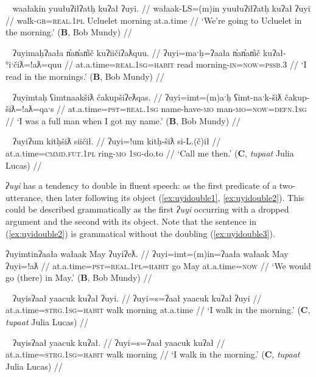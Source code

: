 \ex~ \label{ex:uyiobj}
\begingl
\glpreamble waałakin yuułuʔiłʔatḥ kuʔał ʔuyi. //
\gla wałaak-LS=(m)in yuułuʔiłʔatḥ kuʔał ʔuyi //
\glb walk-\textsc{gr}=\textsc{real.1pl} Ucluelet morning at.a.time //
\glft `We're going to Ucluelet in the morning.' (\textbf{B}, Bob Mundy) //
\endgl
\xe

\ex~ \label{ex:uyipssb}
\begingl
\glpreamble ʔuyimaḥʔaała n̓an̓an̓ič kuʔiičiʔaƛquu. //
\gla ʔuyi=maˑḥ=ʔaała n̓an̓an̓ič kuʔał-°iˑčiƛ=!aƛ=quu //
\glb at.a.time=\textsc{real.1sg}=\textsc{habit} read morning-\textsc{in}=\textsc{now}=\textsc{pssb.3} //
\glft `I read in the mornings.' (\textbf{B}, Bob Mundy) //
\endgl
\xe

\ex~ \label{ex:uyidef}
\begingl
\glpreamble ʔuyimtaḥ ʕimtnaakšiƛ čakupšiʔeƛqas. //
\gla ʔuyi=imt=(m)aˑḥ ʕimt-naˑk-šiƛ čakup-šiƛ=!aƛ=qaˑs //
\glb at.a.time=\textsc{pst}=\textsc{real.1sg} name-have-\textsc{mo} man-\textsc{mo}=\textsc{now}=\textsc{defn.1sg} //
\glft `I was a full man when I got my name.' (\textbf{B}, Bob Mundy) //
\endgl
\xe

\ex~ \label{ex:uyidrop}
\begingl
\glpreamble ʔuyiʔum kitḥšiƛ siičił. //
\gla ʔuyi=!um kitḥ-šiƛ si-L.(č)ił //
\glb at.a.time=\textsc{cmmd.fut.1pl} ring-\textsc{mo} \textsc{1sg}-do.to //
\glft `Call me then.' (\textbf{C}, \textit{tupaat} Julia Lucas) //
\endgl
\xe

\textit{ʔuyi} has a tendency to double in fluent speech: as the first predicate of a two-utterance, then later following its object (\ref{ex:uyidouble1}, \ref{ex:uyidouble2}). This could be described grammatically as the first \textit{ʔuyi} occurring with a dropped argument and the second with its object.  Note that the sentence in (\ref{ex:uyidouble2}) is grammatical without the doubling (\ref{ex:uyidouble3}).

\ex \label{ex:uyidouble1}
\begingl
\glpreamble ʔuyimtinʔaała wałaak May ʔuyiʔeƛ. //
\gla ʔuyi=imt=(m)in=ʔaała wałaak May ʔuyi=!aƛ //
\glb at.a.time=\textsc{pst}=\textsc{real.1pl}=\textsc{habit} go May at.a.time=\textsc{now} //
\glft `We would go (there) in May.' (\textbf{B}, Bob Mundy) //
\endgl
\xe

\ex~ \label{ex:uyidouble2}
\begingl
\glpreamble ʔuyisʔaał yaacuk kuʔał ʔuyi. //
\gla ʔuyi=s=ʔaał yaacuk kuʔał ʔuyi //
\glb at.a.time=\textsc{strg.1sg}=\textsc{habit} walk morning at.a.time //
\glft `I walk in the morning.' (\textbf{C}, \textit{tupaat} Julia Lucas) //
\endgl
\xe

\ex~ \label{ex:uyidouble3}
\begingl
\glpreamble ʔuyisʔaał yaacuk kuʔał. //
\gla ʔuyi=s=ʔaał yaacuk kuʔał //
\glb at.a.time=\textsc{strg.1sg}=\textsc{habit} walk morning //
\glft `I walk in the morning.' (\textbf{C}, \textit{tupaat} Julia Lucas) //
\endgl
\xe

